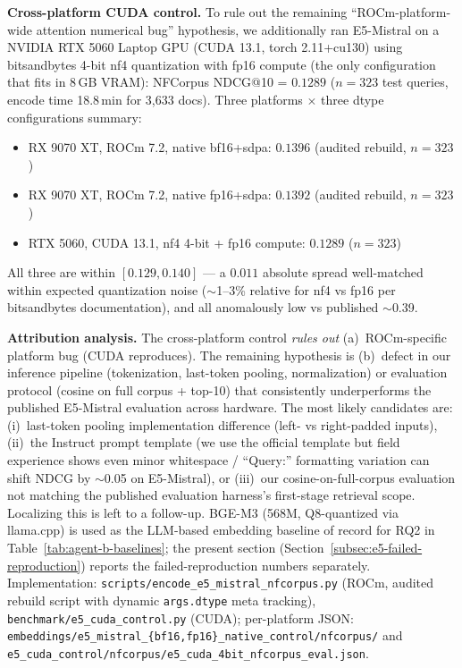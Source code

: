 \documentclass[review,1p]{elsarticle}
\begin{document}
\textbf{Cross-platform CUDA control.} To rule out the remaining ``ROCm-platform-wide attention numerical bug'' hypothesis, we additionally ran E5-Mistral on a NVIDIA RTX 5060 Laptop GPU (CUDA 13.1, torch 2.11+cu130) using bitsandbytes 4-bit nf4 quantization with fp16 compute (the only configuration that fits in 8\,GB VRAM): NFCorpus NDCG@10 = $\mathbf{0.1289}$ ($n=323$ test queries, encode time 18.8\,min for 3{,}633 docs). Three platforms $\times$ three dtype configurations summary:
\begin{itemize}
\item RX 9070 XT, ROCm 7.2, native bf16+sdpa: $0.1396$ (audited rebuild, $n=323$)
\item RX 9070 XT, ROCm 7.2, native fp16+sdpa: $0.1392$ (audited rebuild, $n=323$)
\item RTX 5060, CUDA 13.1, nf4 4-bit + fp16 compute: $0.1289$ ($n=323$)
\end{itemize}
All three are within $[0.129, 0.140]$ --- a $0.011$ absolute spread well-matched within expected quantization noise ($\sim$1--3\% relative for nf4 vs fp16 per bitsandbytes documentation), and all anomalously low vs published $\sim$0.39.

\textbf{Attribution analysis.} The cross-platform control \emph{rules out} (a)~ROCm-specific platform bug (CUDA reproduces). The remaining hypothesis is (b)~defect in our inference pipeline (tokenization, last-token pooling, normalization) or evaluation protocol (cosine on full corpus + top-10) that consistently underperforms the published E5-Mistral evaluation across hardware. The most likely candidates are: (i)~last-token pooling implementation difference (left- vs right-padded inputs), (ii)~the Instruct prompt template (we use the official template but field experience shows even minor whitespace / ``Query:'' formatting variation can shift NDCG by $\sim$0.05 on E5-Mistral), or (iii)~our cosine-on-full-corpus evaluation not matching the published evaluation harness's first-stage retrieval scope. Localizing this is left to a follow-up. BGE-M3 (568M, Q8-quantized via llama.cpp) is used as the LLM-based embedding baseline of record for RQ2 in Table~\ref{tab:agent-b-baselines}; the present section (Section~\ref{subsec:e5-failed-reproduction}) reports the failed-reproduction numbers separately. Implementation: \texttt{scripts/encode\_e5\_mistral\_nfcorpus.py} (ROCm, audited rebuild script with dynamic \texttt{args.dtype} meta tracking), \texttt{benchmark/e5\_cuda\_control.py} (CUDA); per-platform JSON: \texttt{embeddings/e5\_mistral\_\{bf16,fp16\}\_native\_control/nfcorpus/} and \texttt{e5\_cuda\_control/nfcorpus/e5\_cuda\_4bit\_nfcorpus\_eval.json}.
\end{document}
